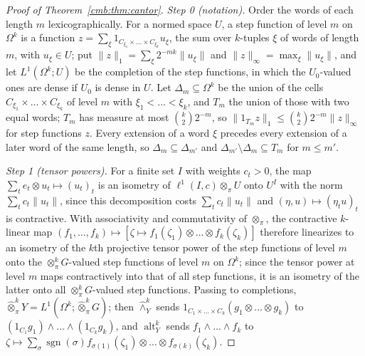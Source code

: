 \documentclass[11pt]{amsart}
\theoremstyle{definition}
\theoremstyle{remark}
\numberwithin{equation}{section}
\newcommand{\sgn}{\operatorname{sgn}}
\newcommand{\norm}[1]{\lVert #1\rVert}
\theoremstyle{plain}
\theoremstyle{definition}
\theoremstyle{plain}
\newcommand{\alt}{\operatorname{alt}}
\begin{document}
\begin{proof}[Proof of Theorem~\ref{cmb:thm:cantor}]
\emph{Step 0 (notation).} Order the words of each length $m$ lexicographically. For a normed space $U$, a step function of
level $m$ on $\Omega^k$ is a function $z=\sum_\xi1_{C_{\xi_1}\times\dots\times C_{\xi_k}}u_\xi$, the sum over $k$-tuples
$\xi$ of words of length $m$, with $u_\xi\in U$; put $\norm z_1=\sum_\xi2^{-mk}\norm{u_\xi}$ and
$\norm z_\infty=\max_\xi\norm{u_\xi}$, and let $L^1(\Omega^k;U)$ be the completion of the step functions, in which the
$U_0$-valued ones are dense if $U_0$ is dense in $U$. Let $\Delta_m\subseteq\Omega^k$ be the union of the cells
$C_{\xi_1}\times\dots\times C_{\xi_k}$ of level $m$ with $\xi_1<\dots<\xi_k$, and $T_m$ the union of those with two equal
words; $T_m$ has measure at most $\binom k22^{-m}$, so $\norm{1_{T_m}z}_1\le\binom k22^{-m}\norm z_\infty$ for step
functions $z$. Every extension of a word $\xi$ precedes every extension of a later word of the same length, so
$\Delta_m\subseteq\Delta_{m'}$ and $\Delta_{m'}\setminus\Delta_m\subseteq T_m$ for $m\le m'$.

\emph{Step 1 (tensor powers).} For a finite set $I$ with weights $c_t>0$, the map $\sum_te_t\otimes u_t\mapsto(u_t)_t$ is
an isometry of $\ell^1(I,c)\otimes_\pi U$ onto $U^I$ with the norm $\sum_tc_t\norm{u_t}$, since this decomposition costs
$\sum_tc_t\norm{u_t}$ and $(\eta,u)\mapsto(\eta_tu)_t$ is contractive. With associativity and commutativity of
$\otimes_\pi$, the contractive $k$-linear map $(f_1,\dots,f_k)\mapsto[\zeta\mapsto f_1(\zeta_1)\otimes\dots\otimes
f_k(\zeta_k)]$ therefore linearizes to an isometry of the $k$th projective tensor power of the step functions of level $m$
onto the $\otimes^k_\pi G$-valued step functions of level $m$ on $\Omega^k$; since the tensor power at level $m$ maps
contractively into that of all step functions, it is an isometry of the latter onto all $\otimes^k_\pi G$-valued step
functions. Passing to completions, $\widehat\otimes^k_\pi Y=L^1(\Omega^k;\widehat\otimes^k_\pi G)$; then
$\widehat\wedge^k_Y$ sends $1_{C_1\times\dots\times C_k}(g_1\otimes\dots\otimes g_k)$ to
$(1_{C_1}g_1)\wedge\dots\wedge(1_{C_k}g_k)$, and $\alt^k_Y$ sends $f_1\wedge\dots\wedge f_k$ to
$\zeta\mapsto\sum_\sigma\sgn(\sigma)f_{\sigma(1)}(\zeta_1)\otimes\dots\otimes f_{\sigma(k)}(\zeta_k)$.


\end{proof}
\end{document}

